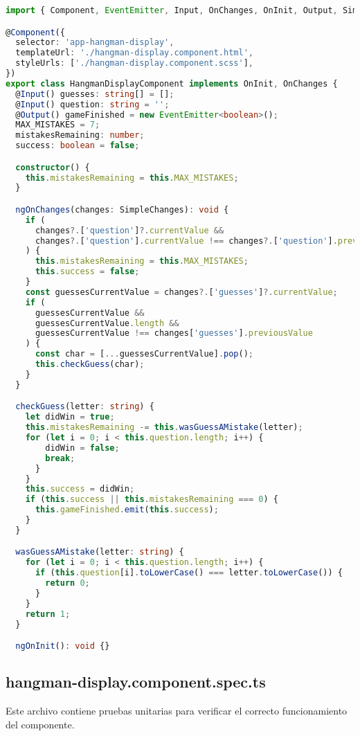 \begin{lstlisting}[language=TypeScript]
import { Component, EventEmitter, Input, OnChanges, OnInit, Output, SimpleChanges } from '@angular/core';

@Component({
  selector: 'app-hangman-display',
  templateUrl: './hangman-display.component.html',
  styleUrls: ['./hangman-display.component.scss'],
})
export class HangmanDisplayComponent implements OnInit, OnChanges {
  @Input() guesses: string[] = [];
  @Input() question: string = '';
  @Output() gameFinished = new EventEmitter<boolean>();
  MAX_MISTAKES = 7;
  mistakesRemaining: number;
  success: boolean = false;

  constructor() {
    this.mistakesRemaining = this.MAX_MISTAKES;
  }

  ngOnChanges(changes: SimpleChanges): void {
    if (
      changes?.['question']?.currentValue &&
      changes?.['question'].currentValue !== changes?.['question'].previousValue
    ) {
      this.mistakesRemaining = this.MAX_MISTAKES;
      this.success = false;
    }
    const guessesCurrentValue = changes?.['guesses']?.currentValue;
    if (
      guessesCurrentValue &&
      guessesCurrentValue.length &&
      guessesCurrentValue !== changes['guesses'].previousValue
    ) {
      const char = [...guessesCurrentValue].pop();
      this.checkGuess(char);
    }
  }

  checkGuess(letter: string) {
    let didWin = true;
    this.mistakesRemaining -= this.wasGuessAMistake(letter);
    for (let i = 0; i < this.question.length; i++) {
        didWin = false;
        break;
      }
    }
    this.success = didWin;
    if (this.success || this.mistakesRemaining === 0) {
      this.gameFinished.emit(this.success);
    }
  }

  wasGuessAMistake(letter: string) {
    for (let i = 0; i < this.question.length; i++) {
      if (this.question[i].toLowerCase() === letter.toLowerCase()) {
        return 0;
      }
    }
    return 1;
  }

  ngOnInit(): void {}
\end{lstlisting}

\subsection{hangman-display.component.spec.ts}

Este archivo contiene pruebas unitarias para verificar el correcto funcionamiento del componente.


